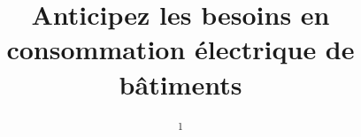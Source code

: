 \title{Anticipez les besoins en consommation électrique de bâtiments} %


\author{
	\newline\newline %
	\textsuperscript{1}\\ %
}

